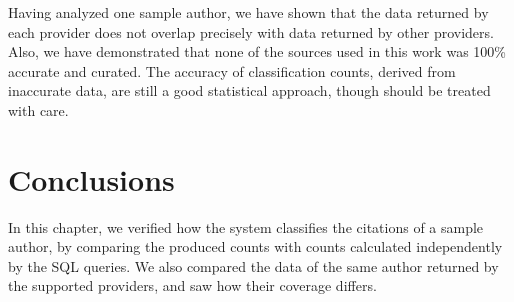 Having analyzed one sample author, we have shown that the data returned by each provider does not overlap precisely with data returned by other providers.
Also, we have demonstrated that none of the sources used in this work was 100\% accurate and curated.
The accuracy of classification counts, derived from inaccurate data, are still a good statistical approach, though should be treated with care.

\section{Conclusions} \label{sec:ch5-conclusions}

In this chapter, we verified how the system classifies the citations of a sample author, by comparing the produced counts with counts calculated independently by the SQL queries.
We also compared the data of the same author returned by the supported providers, and saw how their coverage differs.


